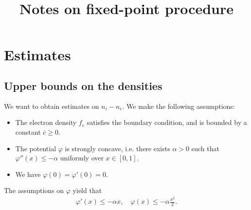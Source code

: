 \documentclass{article}
\title{Notes on fixed-point procedure}
\author{}
\date{}
\numberwithin{equation}{section}
\newcommand{\mysubeq}[2]{ %
	\begin{subequations}\label{#1}
		\begin{align}[left = {\empheqlbrace}]
			#2
		\end{align}
	\end{subequations}	
}
\newcommand{\maxfe}{{\overline{c}}} %
\begin{document}
\maketitle

%
%

\tableofcontents


\section{Estimates}

\subsection{Upper bounds on the densities}

We want to obtain estimates on $n_i - n_e$. We make the following assumptions:
\begin{itemize}
\item The electron density $f_e$ satisfies the boundary condition, and is bounded by a constant $\maxfe \geqslant 0$. 
\item The potential $\varphi$ is strongly concave, i.e. there exists $\alpha>0$ such that $\varphi''(x) \leqslant - \alpha$ uniformly over $x\in[0,1]$.
\item We have $\varphi(0) = \varphi'(0) = 0$.
\end{itemize}
The assumptions on $\varphi$ yield that
\begin{align}\label{eq:phi_concave_consequences}
	\varphi'(x) \leqslant- \alpha x, \quad \varphi(x) \leqslant - \alpha \frac{x^2}{2}.
\end{align}
\end{document}
